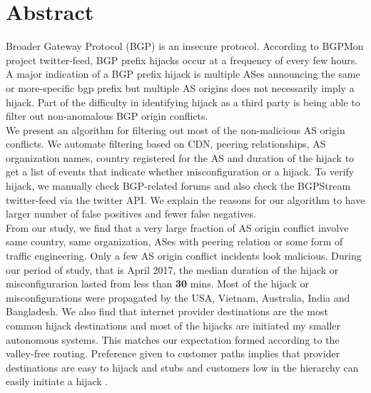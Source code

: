  \section{Abstract}\label{sec:abstract}
Broader Gateway Protocol (BGP) is an insecure protocol. According to BGPMon project twitter-feed, BGP prefix hijacks occur at a frequency of every few hours. A major indication of a BGP prefix hijack is multiple ASes announcing the same or more-specific bgp prefix but multiple AS origins does not necessarily imply a hijack. Part of the difficulty in identifying hijack as a third party is being able to filter out non-anomalous BGP origin conflicts.\\
We present an algorithm for filtering out most of the non-malicious AS origin conflicts. We automate filtering based on CDN, peering relationships, AS organization names, country registered for the AS and duration of the hijack to get a list of events that indicate whether misconfiguration or a hijack. To verify hijack, we manually check BGP-related forums and also check the BGPStream twitter-feed via the twitter API. We explain the reasons for our algorithm to have larger number of false positives and fewer false negatives. \\
From our study, we find that a very large fraction of AS origin conflict involve same country, same organization, ASes with peering relation or some form of traffic engineering. Only a few AS origin conflict incidents look malicious. During our period of study, that is April 2017, the median duration of the hijack or misconfigurarion lasted from less than \textbf{30 }mins. Most of the hijack or misconfigurations were propagated by the USA, Vietnam, Australia, India and Bangladesh. We also find that internet provider destinations are the most common hijack destinations and most of the hijacks are initiated my smaller autonomous systems. This matches our expectation formed according to the valley-free routing. Preference given to customer paths implies that provider destinations are easy to hijack and stubs and  customers low in the hierarchy can easily initiate a hijack .